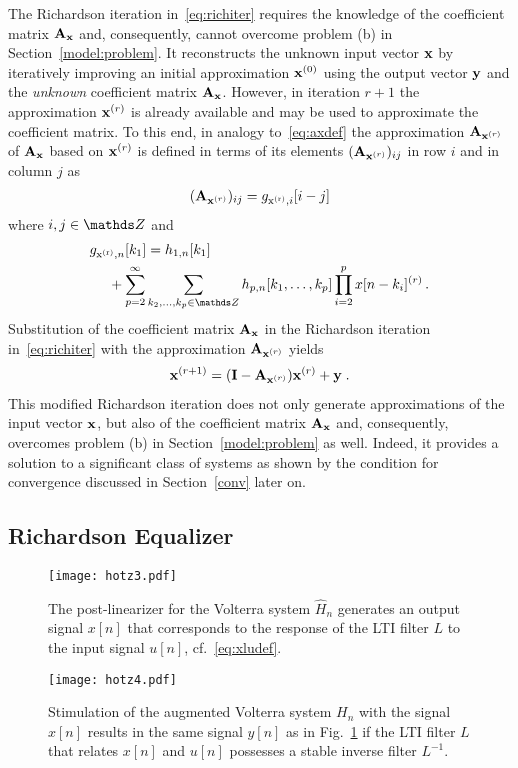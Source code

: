 \documentclass[10pt,twocolumn,twoside]{IEEEtran}
\begin{document}
The Richardson iteration in~\eqref{eq:richiter} requires the knowledge of the
coefficient matrix $\bm{\mathrm{A}}_{\bm{\mathrm{x}}}$ and, consequently, cannot overcome problem
(b) in Section~\ref{model:problem}. It reconstructs the unknown input vector
$\bm{\mathrm{x}}$ by iteratively improving an initial approximation $\bm{\mathrm{x}}^{(0)}$ using the
output vector $\bm{\mathrm{y}}$ and the \emph{unknown} coefficient matrix $\bm{\mathrm{A}}_{\bm{\mathrm{x}}}$.
However, in iteration $r+1$ the approximation $\bm{\mathrm{x}}^{(r)}$ is already available and may
be used to approximate the coefficient matrix. To this end, in analogy to~\eqref{eq:axdef} the approximation
$\bm{\mathrm{A}}_{\bm{\mathrm{x}}^{(r)}}$ of $\bm{\mathrm{A}}_{\bm{\mathrm{x}}}$ based on $\bm{\mathrm{x}}^{(r)}$ is defined in
terms of its elements $(\bm{\mathrm{A}}_{\bm{\mathrm{x}}^{(r)}})_{ij}$ in row $i$ and in column $j$ as
\begin{align}
	(\bm{\mathrm{A}}_{\bm{\mathrm{x}}^{(r)}})_{ij} = g_{\mathrm{x^{(r)}},i}[i-j]
	\label{eq:axrdef}
\end{align}
where $i,j\in\Z$ and
\begin{align}
	\begin{split}
	&\sg{x^{(r)}}{n}[k_1] = h_{1,n}[k_1] \\
		&\quad\ + \sum_{p=2}^\infty \sum_{k_2,\ldots,k_p\in\Z}
			h_{p,n}[k_1,\ldots,k_p]\prod_{i=2}^p x[n-k_i]^{(r)}\,.
	\end{split}
	\label{eq:gxrn}
\end{align}
Substitution of the coefficient matrix $\bm{\mathrm{A}}_{\bm{\mathrm{x}}}$ in the Richardson iteration
in~\eqref{eq:richiter} with the approximation $\bm{\mathrm{A}}_{\bm{\mathrm{x}}^{(r)}}$ yields
\begin{align}
	\bm{\mathrm{x}}^{(r+1)} = (\bm{\mathrm{I}}-\bm{\mathrm{A}}_{\bm{\mathrm{x}}^{(r)}})\bm{\mathrm{x}}^{(r)} + \bm{\mathrm{y}}\;.
	\label{eq:richeqvec}
\end{align}
This modified Richardson iteration does not only generate approximations of the input vector $\bm{\mathrm{x}}$, but
also of the coefficient matrix $\bm{\mathrm{A}}_{\bm{\mathrm{x}}}$ and, consequently, overcomes problem (b)
in Section~\ref{model:problem} as well. Indeed, it provides a solution to a
significant class of systems as shown by the condition for convergence discussed
in Section~\ref{conv} later on.

\subsection{Richardson Equalizer}
	\label{mlim:richeq}

\begin{figure}[!t]
	\centering
	\texttt{[image: hotz3.pdf]}
	\caption{The post-linearizer for the Volterra system $\hat{H}_n$
		generates an output signal $x[n]$ that corresponds to the response of the
		LTI filter $L$ to the input signal $u[n]$, cf.~\eqref{eq:xludef}.}
	\label{fig:hnpostlin:a}
\end{figure}
\begin{figure}[!t]
	\centering
	\texttt{[image: hotz4.pdf]}
	\caption{Stimulation of the augmented Volterra system $H_n$ with the signal $x[n]$
		results in the same signal $y[n]$ as in Fig.~\ref{fig:hnpostlin:a} if the LTI
		filter $L$ that relates $x[n]$ and $u[n]$ possesses a stable inverse filter $L^{-1}$.}
	\label{fig:postlinaltsys}
\end{figure}
\end{document}
